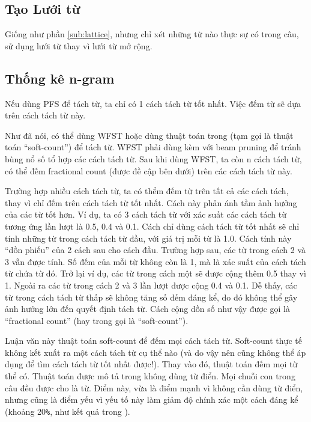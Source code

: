 \documentclass[a4paper,oneside]{book} %
\begin{document}
\subsection{Tạo Lưới từ}
Giống như phần \ref{sub:lattice}, nhưng chỉ xét những từ nào thực sự
có trong câu, sử dụng lưới từ thay vì lưới từ mở rộng.


\subsection{Thống kê n-gram}
\label{sub:wordcount}

Nếu dùng PFS để tách từ, ta chỉ có 1 cách tách từ tốt nhất. Việc đếm
từ sẽ dựa trên cách tách từ này.

Như đã nói, có thể dùng WFST hoặc dùng thuật toán trong
\cite{softcount} (tạm gọi là thuật toán ``soft-count'') để tách
từ. WFST phải dùng kèm với beam pruning để tránh bùng nổ số tổ hợp các
cách tách từ. Sau khi dùng WFST, ta còn n cách tách từ, có thể đếm
fractional count (được đề cập bên dưới) trên các cách tách từ này.

Trường hợp nhiều cách tách từ, ta có thểm đếm từ trên tất cả các cách
tách, thay vì chỉ đếm trên cách tách từ tốt nhất. Cách này phản ánh
tầm ảnh hưởng của các từ tốt hơn. Ví dụ, ta có 3 cách tách từ với xác
suất các cách tách từ tương ứng lần lượt là 0.5, 0.4 và 0.1. Cách chỉ
dùng cách tách từ tốt nhất sẽ chỉ tính những từ trong cách tách từ
đầu, với giá trị mỗi từ là 1.0. Cách tính này ``dồn phiếu'' của 2 cách
sau cho cách đầu. Trường hợp sau, các từ trong cách 2 và 3 vẫn được
tính. Số đếm của mỗi từ không còn là 1, mà là xác suất của cách tách
từ chứa từ đó. Trở lại ví dụ, các từ trong cách một sẽ được cộng thêm
0.5 thay vì 1. Ngoài ra các từ trong cách 2 và 3 lần lượt được cộng
0.4 và 0.1. Dễ thấy, các từ trong cách tách từ thấp sẽ không tăng số
đếm đáng kể, do đó không thể gây ảnh hưởng lớn đến quyết định tách từ.
Cách cộng dồn số như vậy được gọi là ``fractional count'' (hay trong
\cite{softcount} gọi là ``soft-count'').

Luận văn này thuật toán soft-count để đếm mọi cách tách từ. Soft-count
thực tế không kết xuất ra một cách tách từ cụ thể nào (và do vậy nên
cũng không thể áp dụng để tìm cách tách từ tốt nhất được!). Thay vào
đó, thuật toán đếm mọi từ thể có. Thuật toán được mô tả trong
\cite{softcount} không dùng từ điển. Mọi chuỗi con trong câu đều được
cho là từ. Điểm này, vừa là điểm mạnh vì không cần dùng từ
điển, nhưng cũng là điểm yếu vì yếu tố này làm giảm độ chính xác một
cách đáng kể (khoảng 20\verb#%#, như kết quả trong \cite{softcount}).
\end{document}
